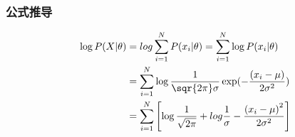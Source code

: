 \documentclass[11pt]{article}
\begin{document}
\subsubsection{公式推导}
\label{sec:org5a615a4}
\begin{equation}
\begin{align}
\label{eq:4}
\log P(X|\theta) &= log \sum_{i=1}^N P(x_i|\theta) = \sum\limits_{i=1}^N \log P(x_i|\theta)\\
&= \sum\limits_{i = 1}^N \log \frac{1}{\sqr{2\pi}\sigma} \exp( -\frac{(x_i-\mu)}{2\sigma^{2}})\\
&= \sum\limits_{i=1}^N \left[ \log \frac{1}{ \sqrt{2\pi}} + log \frac{1}{\sigma} - \frac{\left( x_i -\mu \right)^2}{2\sigma^2} \right]
\end{align}
\end{equation}
\end{document}
